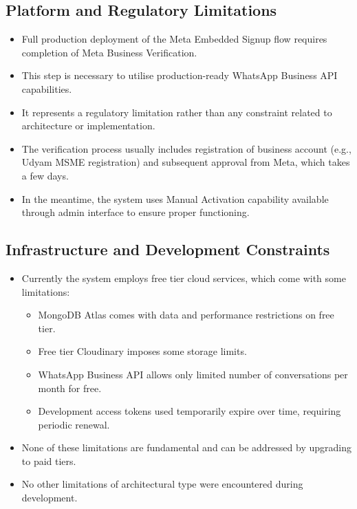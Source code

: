 \subsection{Platform and Regulatory Limitations}

\begin{itemize}
    \item Full production deployment of the Meta Embedded Signup flow requires completion of Meta Business Verification.
    \item This step is necessary to utilise production-ready WhatsApp Business API capabilities.
    \item It represents a regulatory limitation rather than any constraint related to architecture or implementation.
    \item The verification process usually includes registration of business account (e.g., Udyam MSME registration) and subsequent approval from Meta, which takes a few days.
    \item In the meantime, the system uses Manual Activation capability available through admin interface to ensure proper functioning.
\end{itemize}

\subsection{Infrastructure and Development Constraints}

\begin{itemize}
    \item Currently the system employs free tier cloud services, which come with some limitations:
    \begin{itemize}
        \item MongoDB Atlas comes with data and performance restrictions on free tier.
        \item Free tier Cloudinary imposes some storage limits.
        \item WhatsApp Business API allows only limited number of conversations per month for free.
        \item Development access tokens used temporarily expire over time, requiring periodic renewal.
    \end{itemize}
    \item None of these limitations are fundamental and can be addressed by upgrading to paid tiers.
    \item No other limitations of architectural type were encountered during development.
\end{itemize}

